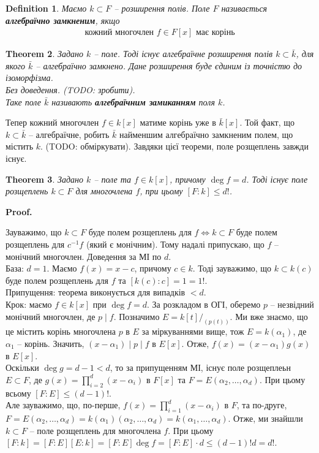 \documentclass[a4paper, 10pt]{article}
\makeatletter
\theoremstyle{theoremdd}
\newtheorem{theorem}{Theorem}[subsection]
\theoremstyle{theoremdd}
\newtheorem{definition}[theorem]{Definition}
\theoremstyle{theoremdd}
\theoremstyle{theoremdd}
\theoremstyle{theoremdd}
\theoremstyle{theoremdd}
\theoremstyle{theoremdd}
\theoremstyle{theoremdd}
\theoremstyle{theoremdd}
\theoremstyle{theoremdd}
\theoremstyle{theoremdd}
\theoremstyle{theoremdd}
\theoremstyle{theoremdd}
\theoremstyle{theoremdd}
\theoremstyle{theoremdd}
\renewenvironment{proof}[1][Proof.\\]{\par
\pushQED{\hfill \qed}%
\normalfont \topsep6\p@\@plus6\p@\relax
\trivlist
\item\relax
{\bfseries
#1\@addpunct{.}}\hspace\labelsep\ignorespaces
}{%
\popQED\endtrivlist\@endpefalse
}
\makeatother
\begin{document}
\begin{definition}
Маємо $k \subset F$ -- розширення полів.
Поле $F$ називається \textbf{алгебраїчно замкненим}, якщо
\begin{align*}
\text{кожний многочлен } f \in F[x] \text{ має корінь}
\end{align*}
\end{definition}

\begin{theorem}
Задано $k$ -- поле. Тоді існує алгебраїчне розширення полів $k \subset \bar{k}$, для якого $\bar{k}$ -- алгебраїчно замкнено. Дане розширення буде єдиним із точністю до ізоморфізма.\\
\textit{Без доведення. (TODO: зробити).}
\bigskip \\
Таке поле $\bar{k}$ називають \textbf{алгебраїчним замиканням} поля $k$.
\end{theorem}

Тепер кожний многочлен $f \in k[x]$ матиме корінь уже в $\bar{k}[x]$. Той факт, що $k \subset \bar{k}$ -- алгебраїчне, робить $\bar{k}$ найменшим алгебраїчно замкненим полем, що містить $k$. (TODO: обміркувати). Завдяки цієї теореми, поле розщеплень завжди існує.

\begin{theorem}
Задано $k$ -- поле та $f \in k[x]$, причому $\deg f = d$. Тоді існує поле розщеплень $k \subset F$ для многочлена $f$, при цьому $[F:k] \leq d!$.
\end{theorem}

\begin{proof}
Зауважимо, що $k \subset F$ буде полем розщеплень для $f \iff k \subset F$ буде полем розщеплень для $c^{-1}f$ (який є монічним). Тому надалі припускаю, що $f$ -- монічний многочлен. Доведення за МІ по $d$.\\
База: $d = 1$. Маємо $f(x) = x-c$, причому $c \in k$. Тоді зауважимо, що $k \subset k(c)$ буде полем розщеплень для $f$ та $[k(c):c] = 1 = 1!$.\\
Припущення: теорема виконується для випадків $< d$.\\
Крок: маємо $f \in k[x]$ при $\deg f = d$. За розкладом в ОГІ, оберемо $p$ -- незвідний монічний многочлен, де $p \mid f$. Позначимо $E = k[t]/_{(p(t))}$. Ми вже знаємо, що це містить корінь многочлена $p$ в $E$ за міркуваннями вище, тож $E = k(\alpha_1)$, де $\alpha_1$ -- корінь. Значить, $(x-\alpha_1) \mid p \mid f$ в $E[x]$. Отже, $f(x) = (x-\alpha_1)g(x)$ в $E[x]$.\\
Оскільки $\deg g = d-1 < d$, то за припущенням МІ, існує поле розщеплеьн $E \subset F$, де $g(x) = \displaystyle\prod_{i=2}^d (x-\alpha_i)$ в $F[x]$ та $F = E(\alpha_2,\dots,\alpha_d)$. При цьому всьому $[F:E] \leq (d-1)!$. \\
Але зауважимо, що, по-перше, $f(x) = \displaystyle\prod_{i=1}^d (x-\alpha_i)$ в $F$, та по-друге, $F = E(\alpha_2,\dots,\alpha_d) = k(\alpha_1)(\alpha_2,\dots,\alpha_d) = k(\alpha_1,\dots,\alpha_d)$. Отже, ми знайшли $k \subset F$ -- поле розщеплень для многочлена $f$. При цьому \\ $[F:k] = [F:E][E:k] = [F:E] \deg f = [F:E] \cdot d \leq (d-1)! d = d!$.
\end{proof}
\end{document}
